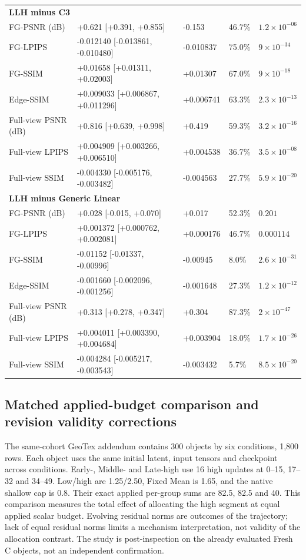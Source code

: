\documentclass[11pt]{article}
\begin{document}
\begin{longtable}{p{2.5cm}p{4.0cm}p{1.5cm}p{1.5cm}p{1.6cm}}
\multicolumn{5}{l}{\textbf{LLH minus C3}}\\
FG-PSNR (dB) & +0.621 [+0.391, +0.855] & -0.153 & 46.7\% & $1.2\times 10^{-06}$ \\
FG-LPIPS & -0.012140 [-0.013861, -0.010480] & -0.010837 & 75.0\% & $9\times 10^{-34}$ \\
FG-SSIM & +0.01658 [+0.01311, +0.02003] & +0.01307 & 67.0\% & $9\times 10^{-18}$ \\
Edge-SSIM & +0.009033 [+0.006867, +0.011296] & +0.006741 & 63.3\% & $2.3\times 10^{-13}$ \\
Full-view PSNR (dB) & +0.816 [+0.639, +0.998] & +0.419 & 59.3\% & $3.2\times 10^{-16}$ \\
Full-view LPIPS & +0.004909 [+0.003266, +0.006510] & +0.004538 & 36.7\% & $3.5\times 10^{-08}$ \\
Full-view SSIM & -0.004330 [-0.005176, -0.003482] & -0.004563 & 27.7\% & $5.9\times 10^{-20}$ \\
\multicolumn{5}{l}{\textbf{LLH minus Generic Linear}}\\
FG-PSNR (dB) & +0.028 [-0.015, +0.070] & +0.017 & 52.3\% & $0.201$ \\
FG-LPIPS & +0.001372 [+0.000762, +0.002081] & +0.000176 & 46.7\% & $0.000114$ \\
FG-SSIM & -0.01152 [-0.01337, -0.00996] & -0.00945 & 8.0\% & $2.6\times 10^{-31}$ \\
Edge-SSIM & -0.001660 [-0.002096, -0.001256] & -0.001648 & 27.3\% & $1.2\times 10^{-12}$ \\
Full-view PSNR (dB) & +0.313 [+0.278, +0.347] & +0.304 & 87.3\% & $2\times 10^{-47}$ \\
Full-view LPIPS & +0.004011 [+0.003390, +0.004684] & +0.003904 & 18.0\% & $1.7\times 10^{-26}$ \\
Full-view SSIM & -0.004284 [-0.005217, -0.003543] & -0.003432 & 5.7\% & $8.5\times 10^{-20}$ \\
\bottomrule
\end{longtable}

\endgroup

\subsection*{Matched applied-budget comparison and revision validity corrections}
The same-cohort GeoTex addendum contains 300 objects by six conditions, 1,800 rows. Each object uses the same initial latent, input tensors and checkpoint across conditions. Early-, Middle- and Late-high use 16 high updates at 0--15, 17--32 and 34--49. Low/high are 1.25/2.50, Fixed Mean is 1.65, and the native shallow cap is 0.8. Their exact applied per-group sums are 82.5, 82.5 and 40. This comparison measures the total effect of allocating the high segment at equal applied scalar budget. Evolving residual norms are outcomes of the trajectory; lack of equal residual norms limits a mechanism interpretation, not validity of the allocation contrast. The study is post-inspection on the already evaluated Fresh C objects, not an independent confirmation.
\end{document}
